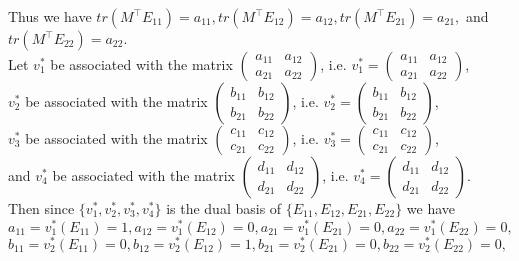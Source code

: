 \documentclass[12pt,a4paper]{article}
\theoremstyle{plain}
\theoremstyle{remark}
\theoremstyle{definition}
\begin{document}
	Thus we have $tr\left(M^{\intercal}E_{11}\right) = a_{11}, tr\left(M^{\intercal}E_{12}\right) = a_{12}, tr\left(M^{\intercal}E_{21}\right) = a_{21},$ and $tr\left(M^{\intercal}E_{22}\right) = a_{22}$.\\
	Let $v_1^*$ be associated with the matrix $\begin{pmatrix}
	a_{11} & a_{12} \\ a_{21} & a_{22}
	\end{pmatrix}$, i.e. $v_1^* = \begin{pmatrix}
	a_{11} & a_{12} \\ a_{21} & a_{22}
	\end{pmatrix}$,\\
	$v_2^*$ be associated with the matrix $\begin{pmatrix}
	b_{11} & b_{12} \\ b_{21} & b_{22}
	\end{pmatrix}$, i.e. $v_2^* = \begin{pmatrix}
	b_{11} & b_{12} \\ b_{21} & b_{22}
	\end{pmatrix}$,\\
	$v_3^*$ be associated with the matrix $\begin{pmatrix}
	c_{11} & c_{12} \\ c_{21} & c_{22}
	\end{pmatrix}$, i.e. $v_3^* = \begin{pmatrix}
	c_{11} & c_{12} \\ c_{21} & c_{22}
	\end{pmatrix}$,\\
	and $v_4^*$ be associated with the matrix $\begin{pmatrix}
	d_{11} & d_{12} \\ d_{21} & d_{22}
	\end{pmatrix}$, i.e. $v_4^* = \begin{pmatrix}
	d_{11} & d_{12} \\ d_{21} & d_{22}
	\end{pmatrix}$.\\
	Then since $\{v_1^*,v_2^*,v_3^*,v_4^*\}$ is the dual basis of $\{E_{11},E_{12},E_{21},E_{22}\}$ we have\\
	$a_{11} = v_1^*(E_{11}) = 1, a_{12} = v_1^*(E_{12}) = 0, a_{21} = v_1^*(E_{21}) = 0, a_{22} = v_1^*(E_{22}) = 0,$\\
	$b_{11} = v_2^*(E_{11}) = 0, b_{12} = v_2^*(E_{12}) = 1, b_{21} = v_2^*(E_{21}) = 0, b_{22} = v_2^*(E_{22}) = 0,$\\
\end{document}
